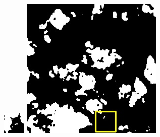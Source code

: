 \documentclass[10pt]{ctexart}
\begin{document}
\begin{multicols}{2}
\begin{figure}[H]
{\begin{minipage}[b]{0.15\linewidth}
            \includegraphics[width=1\linewidth]{../log/spoon2/cut/tmp_cut_LC80350192014190LGN00_06561_unet.jpg}\vspace{4pt}
            \includegraphics[width=1\linewidth]{../log/spoon2/cut/LC80980712014024LGN00_15443_unet.jpg}\vspace{4pt}

\end{minipage}}
\end{figure}
\end{multicols}
\end{document}
